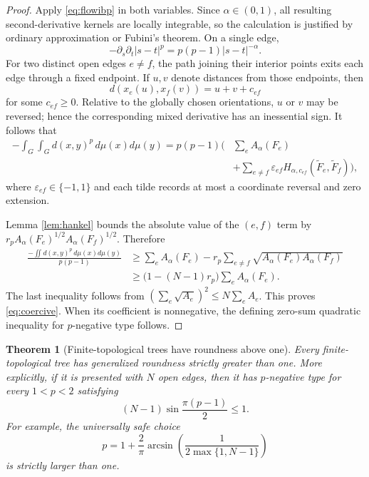 \documentclass[11pt]{article}
\newtheorem{theorem}{Theorem}
\begin{document}
\begin{proof}
Apply \eqref{eq:flowibp} in both variables.  Since
$\alpha\in(0,1)$, all resulting second-derivative kernels are locally
integrable, so the calculation is justified by ordinary approximation or
Fubini's theorem.  On a single edge,
\[
 -\partial_s\partial_t|s-t|^p
 =p(p-1)|s-t|^{-\alpha}.
\]
For two distinct open edges $e\ne f$, the path joining their interior points
exits each edge through a fixed endpoint.  If $u,v$ denote distances from
those endpoints, then
\[
 d(x_e(u),x_f(v))=u+v+c_{ef}
\]
for some $c_{ef}\ge0$.  Relative to the globally chosen orientations,
$u$ or $v$ may be reversed; hence the corresponding mixed derivative has an
inessential sign.  It follows that
\begin{align*}
 -\int_G\!\int_G d(x,y)^p\,d\mu(x)d\mu(y)
 =p(p-1)\bigg(&\sum_e A_\alpha(F_e)\\
 &+\sum_{e\ne f}\varepsilon_{ef}
 H_{\alpha,c_{ef}}(\widetilde F_e,\widetilde F_f)\bigg),
\end{align*}
where $\varepsilon_{ef}\in\{-1,1\}$ and each tilde records at most a
coordinate reversal and zero extension.

Lemma \ref{lem:hankel} bounds the absolute value of the $(e,f)$ term by
$r_p A_\alpha(F_e)^{1/2}A_\alpha(F_f)^{1/2}$.  Therefore
\begin{align*}
 \frac{-\iint d(x,y)^p\,d\mu(x)d\mu(y)}{p(p-1)}
 &\ge \sum_e A_\alpha(F_e)
 -r_p\sum_{e\ne f}\sqrt{A_\alpha(F_e)A_\alpha(F_f)}\\
 &\ge \bigl(1-(N-1)r_p\bigr)\sum_e A_\alpha(F_e).
\end{align*}
The last inequality follows from
$(\sum_e\sqrt{A_e})^2\le N\sum_e A_e$.  This proves
\eqref{eq:coercive}.  When its coefficient is nonnegative, the defining
zero-sum quadratic inequality for $p$-negative type follows.
\end{proof}

\begin{theorem}[Finite-topological trees have roundness above one]
\label{thm:finite-topological}
Every finite-topological tree has generalized roundness strictly greater than
one.  More explicitly, if it is presented with $N$ open edges, then it has
$p$-negative type for every $1<p<2$ satisfying
\begin{equation}\label{eq:range}
 (N-1)\sin\frac{\pi(p-1)}2\le1.
\end{equation}
For example, the universally safe choice
\[
 p=1+\frac2\pi\arcsin\!\left(\frac{1}{2\max\{1,N-1\}}\right)
\]
is strictly larger than one.
\end{theorem}
\end{document}
